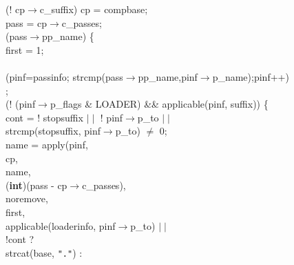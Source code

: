 \begin{flushleft}
\hspace*{3\indentation}{\bf if} (! cp$\rightarrow$c\_suffix) cp = compbase;\mbox{}\\
\hspace*{3\indentation}pass = cp$\rightarrow$c\_passes;\mbox{}\\
\hspace*{3\indentation}{\bf while} (pass$\rightarrow$pp\_name) \{\mbox{}\\
\hspace*{6\indentation}{\bf int} first = 1;\mbox{}\\
\mbox{}\\
\hspace*{6\indentation}{\bf for} (pinf=passinfo; strcmp(pass$\rightarrow$pp\_name,pinf$\rightarrow$p\_name);pinf++)\mbox{}\\
\hspace*{9\indentation};\mbox{}\\
\hspace*{6\indentation}{\bf if} (! (pinf$\rightarrow$p\_flags \& LOADER) \&\& applicable(pinf, suffix)) \{\mbox{}\\
\hspace*{9\indentation}{\bf int} cont = ! stopsuffix $\mid\mid$ ! pinf$\rightarrow$p\_to $\mid\mid$\mbox{}\\
\hspace*{15\indentation}strcmp(stopsuffix, pinf$\rightarrow$p\_to) $\neq$ 0;\mbox{}\\
\hspace*{9\indentation}name = apply(pinf,\mbox{}\\
\hspace*{17\indentation}cp,\mbox{}\\
\hspace*{17\indentation}name,\mbox{}\\
\hspace*{17\indentation}({\bf int})(pass - cp$\rightarrow$c\_passes),\mbox{}\\
\hspace*{17\indentation}noremove,\mbox{}\\
\hspace*{17\indentation}first,\mbox{}\\
\hspace*{17\indentation}applicable(loaderinfo, pinf$\rightarrow$p\_to) $\mid\mid$\mbox{}\\
\hspace*{18\indentation}!cont ?\mbox{}\\
\hspace*{15\indentation}strcat(base, {\tt"."}) :\mbox{}\\

\end{flushleft}
